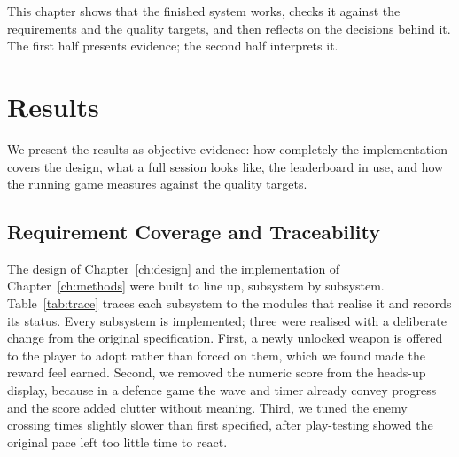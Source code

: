 \documentclass[12pt,a4paper]{report}
\begin{document}
This chapter shows that the finished system works, checks it against the
requirements and the quality targets, and then reflects on the decisions behind
it. The first half presents evidence; the second half interprets it.

\section{Results}

We present the results as objective evidence: how completely the implementation
covers the design, what a full session looks like, the leaderboard in use, and
how the running game measures against the quality targets.

\subsection{Requirement Coverage and Traceability}

The design of Chapter~\ref{ch:design} and the implementation of
Chapter~\ref{ch:methods} were built to line up, subsystem by subsystem.
Table~\ref{tab:trace} traces each subsystem to the modules that realise it and
records its status. Every subsystem is implemented; three were realised with a
deliberate change from the original specification. First, a newly unlocked
weapon is offered to the player to adopt rather than forced on them, which we
found made the reward feel earned. Second, we removed the numeric score from the
heads-up display, because in a defence game the wave and timer already convey
progress and the score added clutter without meaning. Third, we tuned the enemy
crossing times slightly slower than first specified, after play-testing showed
the original pace left too little time to react.
\end{document}

